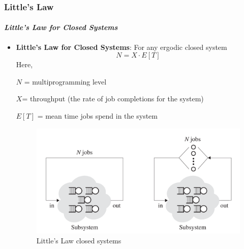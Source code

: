 \documentclass{beamer}
\begin{document}
\begin{frame}
\frametitle{Little’s Law}
\framesubtitle{\textbf{\textit{Little’s Law for Closed Systems}}}

\begin{itemize}
\item \textbf{Little’s Law for Closed Systems}: For any ergodic closed system
$$N= X \cdot E [T ]$$
Here, 

$N$ = multiprogramming level 

$X$= throughput (the rate of job completions for the system)

$E [T ]$ =  mean time jobs spend in the system 


\begin{figure}
\includegraphics[scale=0.19]{images/little_law_for_closed_systems.jpeg}
\caption{ Little’s Law closed systems}
\end{figure}

\end{itemize}
	
\end{frame}
\end{document}
